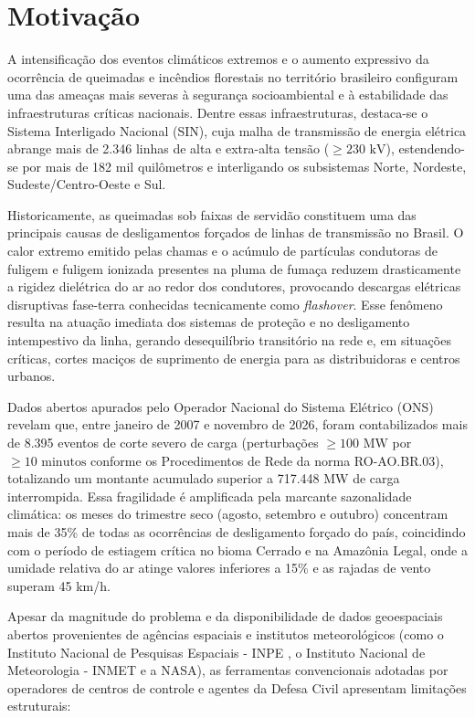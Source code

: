 \newpage
\section{Motivação}
\label{sc:motivacao}

A intensificação dos eventos climáticos extremos e o aumento expressivo da ocorrência de queimadas e incêndios florestais no território brasileiro configuram uma das ameaças mais severas à segurança socioambiental e à estabilidade das infraestruturas críticas nacionais. Dentre essas infraestruturas, destaca-se o Sistema Interligado Nacional (SIN), cuja malha de transmissão de energia elétrica abrange mais de 2.346 linhas de alta e extra-alta tensão ($\ge 230\text{ kV}$), estendendo-se por mais de 182 mil quilômetros e interligando os subsistemas Norte, Nordeste, Sudeste/Centro-Oeste e Sul.

Historicamente, as queimadas sob faixas de servidão constituem uma das principais causas de desligamentos forçados de linhas de transmissão no Brasil. O calor extremo emitido pelas chamas e o acúmulo de partículas condutoras de fuligem e fuligem ionizada presentes na pluma de fumaça reduzem drasticamente a rigidez dielétrica do ar ao redor dos condutores, provocando descargas elétricas disruptivas fase-terra conhecidas tecnicamente como \textit{flashover}. Esse fenômeno resulta na atuação imediata dos sistemas de proteção e no desligamento intempestivo da linha, gerando desequilíbrio transitório na rede e, em situações críticas, cortes maciços de suprimento de energia para as distribuidoras e centros urbanos.

Dados abertos apurados pelo Operador Nacional do Sistema Elétrico (ONS) \cite{ons2026dadosabertos} revelam que, entre janeiro de 2007 e novembro de 2026, foram contabilizados mais de 8.395 eventos de corte severo de carga (perturbações $\ge 100\text{ MW}$ por $\ge 10\text{ minutos}$ conforme os Procedimentos de Rede da norma RO-AO.BR.03), totalizando um montante acumulado superior a 717.448 MW de carga interrompida. Essa fragilidade é amplificada pela marcante sazonalidade climática: os meses do trimestre seco (agosto, setembro e outubro) concentram mais de 35\% de todas as ocorrências de desligamento forçado do país, coincidindo com o período de estiagem crítica no bioma Cerrado e na Amazônia Legal, onde a umidade relativa do ar atinge valores inferiores a 15\% e as rajadas de vento superam 45 km/h.

Apesar da magnitude do problema e da disponibilidade de dados geoespaciais abertos provenientes de agências espaciais e institutos meteorológicos (como o Instituto Nacional de Pesquisas Espaciais - INPE \cite{inpe2025bdqueimadas}, o Instituto Nacional de Meteorologia - INMET e a NASA), as ferramentas convencionais adotadas por operadores de centros de controle e agentes da Defesa Civil apresentam limitações estruturais:

